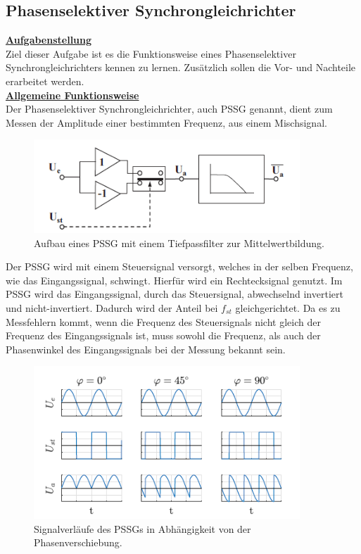 \documentclass[a4paper,12pt]{article}
\begin{document}
	\subsection{Phasenselektiver Synchrongleichrichter}
	\underline{\textbf{Aufgabenstellung}} \\ \newline
	\noindent
	Ziel dieser Aufgabe ist es die Funktionsweise eines Phasenselektiver Synchrongleichrichters kennen zu lernen. Zusätzlich sollen die Vor- und Nachteile erarbeitet werden.\\ \newline
	\underline{\textbf{Allgemeine Funktionsweise}} \\ \newline
	\noindent
	Der Phasenselektiver Synchrongleichrichter, auch PSSG genannt, dient zum Messen der Amplitude einer bestimmten Frequenz, aus einem Mischsignal.\newline
	\begin{figure}[h]
		\centering
		\includegraphics[width=10cm]{assets/pssg}
		\caption{Aufbau eines PSSG mit einem Tiefpassfilter zur Mittelwertbildung.}
	\end{figure}\newline
	Der PSSG wird mit einem Steuersignal versorgt, welches in der selben Frequenz, wie das Eingangssignal, schwingt. Hierfür wird ein Rechtecksignal genutzt.\newline
	Im PSSG wird das Eingangssignal, durch das Steuersignal, abwechselnd invertiert und nicht-invertiert. Dadurch wird der Anteil bei $f_{st}$ gleichgerichtet.\newline
	Da es zu Messfehlern kommt, wenn die Frequenz des Steuersignals nicht gleich der Frequenz des Eingangssignals ist, muss sowohl die Frequenz, als auch der Phasenwinkel des Eingangssignals bei der Messung bekannt sein.
	\begin{figure}[H]
		\centering
		\includegraphics[width=10cm]{assets/signale-pssg}
		\caption{Signalverläufe des PSSGs in Abhängigkeit von der Phasenverschiebung.}
	\end{figure}
\end{document}
